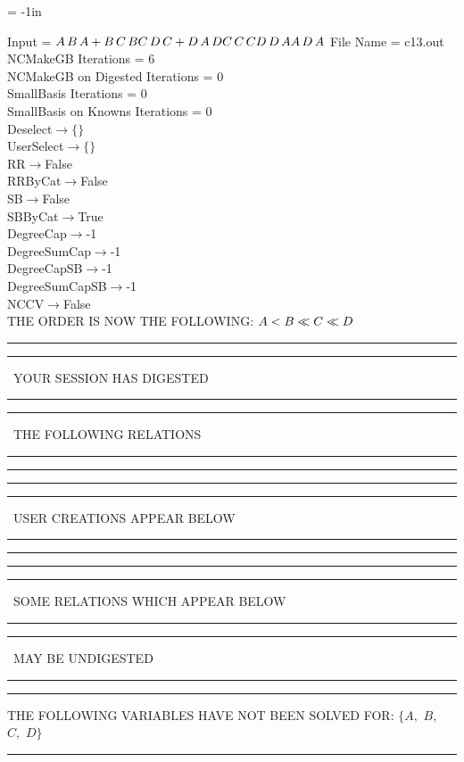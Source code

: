 \voffset = -1in
\evensidemargin 0.1in
\oddsidemargin 0.1in
\textheight 9in
\textwidth 6in

\normalsize
\baselineskip=12pt
\noindent
Input = 
$
\\A\,
 B\,
 A + B\,
 C\,
 B\\
C\,
 D\,
 C + D\,
 A\,
 D\\
C\,
 C\,
 C\\
D\,
 D\,
 A\\
A\,
 D\,
 A\\
$
File Name = c13.out\\
NCMakeGB Iterations = 6\\
NCMakeGB on Digested Iterations = 0\\
SmallBasis Iterations = 0\\
SmallBasis on Knowns Iterations = 0\\
Deselect$\rightarrow \{\}$\\
UserSelect$\rightarrow \{\}$\\
RR$\rightarrow $False\\
RRByCat$\rightarrow $False\\
SB$\rightarrow $False\\
SBByCat$\rightarrow $True\\
DegreeCap$\rightarrow $-1\\
DegreeSumCap$\rightarrow $-1\\
DegreeCapSB$\rightarrow $-1\\
DegreeSumCapSB$\rightarrow $-1\\
NCCV$\rightarrow $False\\
THE ORDER IS NOW THE FOLLOWING:\hfil\break
$
A<B\ll
C\ll
D\\
$
\rule[2pt]{6in}{4pt}\hfil\break
\rule[2pt]{1.879in}{4pt}
\ YOUR SESSION HAS DIGESTED\ 
\rule[2pt]{1.879in}{4pt}\hfil\break
\rule[2pt]{1.923in}{4pt}
\ THE FOLLOWING RELATIONS\ 
\rule[2pt]{1.923in}{4pt}\hfil\break
\rule[2pt]{6in}{4pt}\hfil\break
\rule[2pt]{6in}{1pt}\hfil\break
\rule[2.5pt]{1.701in}{1pt}
\ USER CREATIONS APPEAR BELOW\ 
\rule[2.5pt]{1.701in}{1pt}\hfil\break
\rule[2pt]{6in}{1pt}\hfil\break
\rule[2pt]{6in}{4pt}\hfil\break
\rule[2pt]{1.45in}{4pt}
\ SOME RELATIONS WHICH APPEAR BELOW\ 
\rule[2pt]{1.45in}{4pt}\hfil\break
\rule[2pt]{2.18in}{4pt}
\ MAY BE UNDIGESTED\ 
\rule[2pt]{2.18in}{4pt}\hfil\break
\rule[2pt]{6in}{4pt}\hfil\break
THE FOLLOWING VARIABLES HAVE NOT BEEN SOLVED FOR:\hfil\break
$\{A,
$ $
B,
$ $
C,
$ $
D\}$
\smallskip\\
\rule[3pt]{6in}{.7pt}\\

